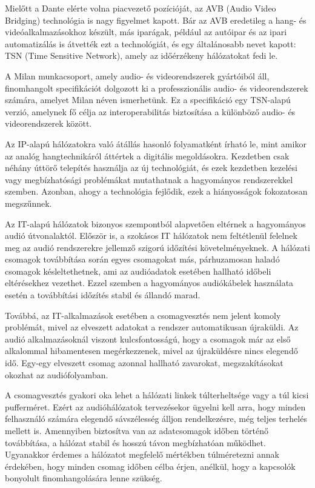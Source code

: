 Mielőtt a Dante elérte volna piacvezető pozícióját, az AVB (Audio Video Bridging) technológia is 
nagy figyelmet kapott. Bár az AVB eredetileg a hang- és videóalkalmazásokhoz készült, 
más iparágak, például az autóipar és az ipari automatizálás is átvették ezt a technológiát, 
és egy általánosabb nevet kapott: TSN (Time Sensitive Network), amely az időérzékeny hálózatokat fedi le.

A Milan munkacsoport, amely audio- és videorendszerek gyártóiból áll, 
finomhangolt specifikációt dolgozott ki a professzionális audio- és videorendszerek számára, 
amelyet Milan néven ismerhetünk. Ez a specifikáció egy TSN-alapú verzió, amelynek fő célja az 
interoperabilitás biztosítása a különböző audio- és videorendszerek között.


Az IP-alapú hálózatokra való átállás hasonló folyamatként írható le, mint amikor az analóg hangtechnikáról áttértek
a digitális megoldásokra. Kezdetben csak néhány úttörő telepítés használja az új technológiát, 
és ezek kezdetben kezelési vagy megbízhatósági problémákat mutathatnak a hagyományos rendszerekkel szemben. 
Azonban, ahogy a technológia fejlődik, ezek a hiányosságok fokozatosan megszűnnek.

Az IT-alapú hálózatok bizonyos szempontból alapvetően eltérnek a hagyományos audió útvonalaktól. 
Először is, a szokásos IT hálózatok nem feltétlenül felelnek meg az audió rendszerekre jellemző 
szigorú időzítési követelményeknek. A hálózati csomagok továbbítása során egyes csomagokat más, 
párhuzamosan haladó csomagok késleltethetnek, ami az audióadatok esetében hallható időbeli eltérésekhez vezethet. 
Ezzel szemben a hagyományos audiókábelek használata esetén a továbbítási időzítés stabil és állandó marad.

Továbbá, az IT-alkalmazások esetében a csomagvesztés nem jelent komoly problémát, mivel az elveszett 
adatokat a rendszer automatikusan újraküldi. Az audió alkalmazásoknál viszont kulcsfontosságú, hogy 
a csomagok már az első alkalommal hibamentesen megérkezzenek, mivel az újraküldésre nincs elegendő idő. 
Egy-egy elveszett csomag azonnal hallható zavarokat, megszakításokat okozhat az audiófolyamban.

A csomagvesztés gyakori oka lehet a hálózati linkek túlterheltsége vagy a túl kicsi pufferméret. 
Ezért az audióhálózatok tervezésekor ügyelni kell arra, hogy minden felhasználó számára elegendő 
sávszélesség álljon rendelkezésre, még teljes terhelés mellett is. Amennyiben biztosítva van az 
adatcsomagok időben történő továbbítása, a hálózat stabil és hosszú távon megbízhatóan működhet. 
Ugyanakkor érdemes a hálózatot megfelelő mértékben túlméretezni annak érdekében, hogy minden csomag 
időben célba érjen, anélkül, hogy a kapcsolók bonyolult finomhangolására lenne szükség.

